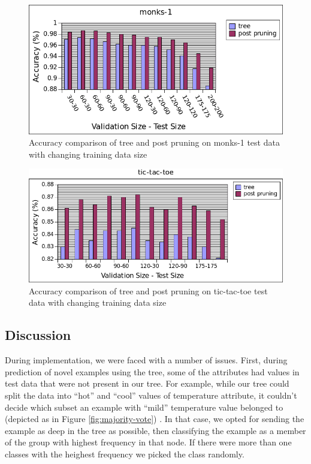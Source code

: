 \documentclass[12pt]{article}
\begin{document}
\begin{figure}[H]
  \centering
  \includegraphics[scale=0.5]{img/monks-1-comparison}
  \caption{Accuracy comparison of tree and post pruning on monks-1 test data with changing training data size}
  \label{fig:monk-comp}
\end{figure}

\begin{figure}[H]
  \centering
  \includegraphics[scale=0.5]{img/tic-tac-toe-comparison}
  \caption{Accuracy comparison of tree and post pruning on tic-tac-toe test data with changing training data size}
  \label{fig:tictactoe-comp}
\end{figure}



\subsection{Discussion}
During implementation, we were faced with a number of issues. First,
during prediction of novel examples using the tree, some of the
attributes had values in test data that were not present in our
tree. For example, while our tree could split the data into ``hot'' and
``cool'' values of temperature attribute, it couldn't decide which
subset an example with ``mild'' temperature value belonged to (depicted as in Figure \ref{fig:majority-vote})
. In that case, we opted for sending the example as deep
in the tree as possible, then classifying the example as a member of
the group with highest frequency in that node. If there were more than
one classes with the heighest frequency we picked the class randomly.
\end{document}
